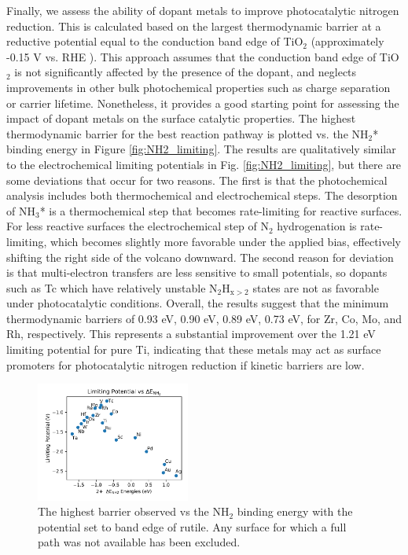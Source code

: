 Finally, we assess the ability of dopant metals to improve photocatalytic nitrogen reduction. This is calculated based on the largest thermodynamic barrier at a reductive potential equal to the conduction band edge of TiO$_2$ (approximately -0.15 V vs. RHE \cite{Nozik_1996}). This approach assumes that the conduction band edge of TiO$_2$ is not significantly affected by the presence of the dopant, and neglects improvements in other bulk photochemical properties such as charge separation or carrier lifetime. Nonetheless, it provides a good starting point for assessing the impact of dopant metals on the surface catalytic properties. 
The highest thermodynamic barrier for the best reaction pathway is plotted vs. the NH$_2$* binding energy in Figure \ref{fig:NH2_limiting}. The results are qualitatively similar to the electrochemical limiting potentials in Fig. \ref{fig:NH2_limiting}, but there are some deviations that occur for two reasons. The first is that the photochemical analysis includes both thermochemical and electrochemical steps. The desorption of NH$_3$* is a thermochemical step that becomes rate-limiting for reactive surfaces. For less reactive surfaces the electrochemical step of N$_2$ hydrogenation is rate-limiting, which becomes slightly more favorable under the applied bias, effectively shifting the right side of the volcano downward. The second reason for deviation is that multi-electron transfers are less sensitive to small potentials, so dopants such as Tc which have relatively unstable N$_2$H$_{\mathrm{x}>2}$ states are not as favorable under photocatalytic conditions. Overall, the results suggest that the minimum thermodynamic barriers of 0.93 eV, 0.90 eV, 0.89 eV, 0.73 eV, for Zr, Co, Mo, and  Rh, respectively. This represents a substantial improvement over the 1.21 eV limiting potential for pure Ti, indicating that these metals may act as surface promoters for photocatalytic nitrogen reduction if kinetic barriers are low.

\begin{figure}
    \centering
    \includegraphics[width=0.45\textwidth]{Images/NH2_v_limiting_pot.pdf}
    \caption{The highest barrier observed vs the NH$_2$ binding energy with the potential set to band edge of rutile. Any surface for which a full path was not available has been excluded.}
    
\end{figure}

